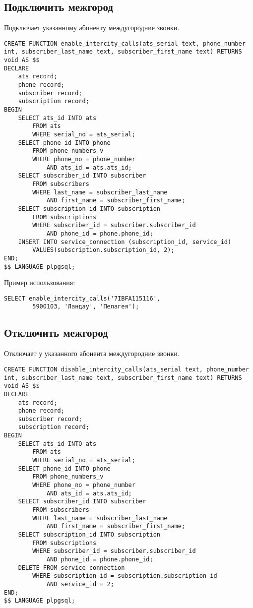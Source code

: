\documentclass{report}
\begin{document}
\subsection*{Подключить межгород}

Подключает указанному абоненту междугородние звонки.

\begin{lstlisting}
CREATE FUNCTION enable_intercity_calls(ats_serial text, phone_number int, subscriber_last_name text, subscriber_first_name text) RETURNS void AS $$
DECLARE
    ats record;
    phone record;
    subscriber record;
    subscription record;
BEGIN
    SELECT ats_id INTO ats 
        FROM ats 
        WHERE serial_no = ats_serial;
    SELECT phone_id INTO phone
        FROM phone_numbers_v
        WHERE phone_no = phone_number
            AND ats_id = ats.ats_id;
    SELECT subscriber_id INTO subscriber
        FROM subscribers
        WHERE last_name = subscriber_last_name
            AND first_name = subscriber_first_name;
    SELECT subscription_id INTO subscription
        FROM subscriptions
        WHERE subscriber_id = subscriber.subscriber_id
            AND phone_id = phone.phone_id;
    INSERT INTO service_connection (subscription_id, service_id)
        VALUES(subscription.subscription_id, 2);
END;
$$ LANGUAGE plpgsql;
\end{lstlisting}

Пример использования:
\begin{lstlisting}
SELECT enable_intercity_calls('7IBFA115116',
        5900103, 'Ландау', 'Пелагея');
\end{lstlisting}

\subsection*{Отключить межгород}

Отключает у указанного абонента междугородние звонки.

\begin{lstlisting}
CREATE FUNCTION disable_intercity_calls(ats_serial text, phone_number int, subscriber_last_name text, subscriber_first_name text) RETURNS void AS $$
DECLARE
    ats record;
    phone record;
    subscriber record;
    subscription record;
BEGIN
    SELECT ats_id INTO ats 
        FROM ats 
        WHERE serial_no = ats_serial;
    SELECT phone_id INTO phone
        FROM phone_numbers_v 
        WHERE phone_no = phone_number
            AND ats_id = ats.ats_id;
    SELECT subscriber_id INTO subscriber
        FROM subscribers
        WHERE last_name = subscriber_last_name
            AND first_name = subscriber_first_name;
    SELECT subscription_id INTO subscription
        FROM subscriptions
        WHERE subscriber_id = subscriber.subscriber_id
            AND phone_id = phone.phone_id;
    DELETE FROM service_connection
        WHERE subscription_id = subscription.subscription_id
            AND service_id = 2;
END;
$$ LANGUAGE plpgsql;
\end{lstlisting}
\end{document}
